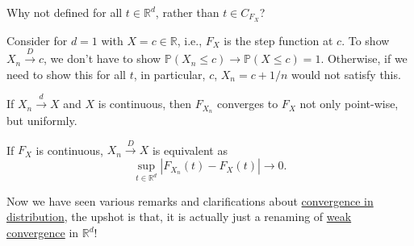 \begin{problem*}
	Why not defined for all \(t \in \mathbb{R} ^d\), rather than \(t \in C_{F_X}\)?
\end{problem*}
\begin{answer}
	Consider for \(d = 1\) with \(X = c \in \mathbb{R} \), i.e., \(F_X\) is the step function at \(c\). To show \(X_n \overset{D}{\to } c\), we don't have to show \(\mathbb{P} (X_n \leq c) \to \mathbb{P} (X \leq c) = 1\). Otherwise, if we need to show this for all \(t\), in particular, \(c\), \(X_n = c + 1 / n\) would not satisfy this.
\end{answer}

If \(X_n \overset{d}{\to } X\) and \(X\) is continuous, then \(F_{X_n}\) converges to \(F_X\) not only point-wise, but uniformly.

\begin{remark}
	If \(F_X\) is continuous, \(X_n \overset{D}{\to } X\) is equivalent as
	\[
		\sup _{t\in \mathbb{R} ^d} \left\vert F_{X_n} (t) - F_X(t) \right\vert \to 0.
	\]
\end{remark}

Now we have seen various remarks and clarifications about \hyperref[def:converge-in-distribution]{convergence in distribution}, the upshot is that, it is actually just a renaming of \hyperref[def:converge-weakly]{weak convergence} in \(\mathbb{R} ^d\)!

